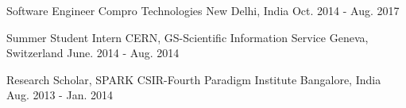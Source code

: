 

\begin{cventries}

  \cventry
    {Software Engineer} %
    {Compro Technologies} %
    {New Delhi, India} %
    {Oct. 2014 - Aug. 2017} %
    {
      \begin{cvitems} %
      \end{cvitems}
    }    

  \cventry
    {Summer Student Intern} %
    {CERN, GS-Scientific Information Service} %
    {Geneva, Switzerland} %
    {June. 2014 - Aug. 2014} %
    {
      \begin{cvitems} %
      \end{cvitems}
    }    

  \cventry
    {Research Scholar, SPARK} %
    {CSIR-Fourth Paradigm Institute} %
    {Bangalore, India} %
    {Aug. 2013 - Jan. 2014} %
    {
      \begin{cvitems} %
      \end{cvitems}
    }    

\end{cventries}
